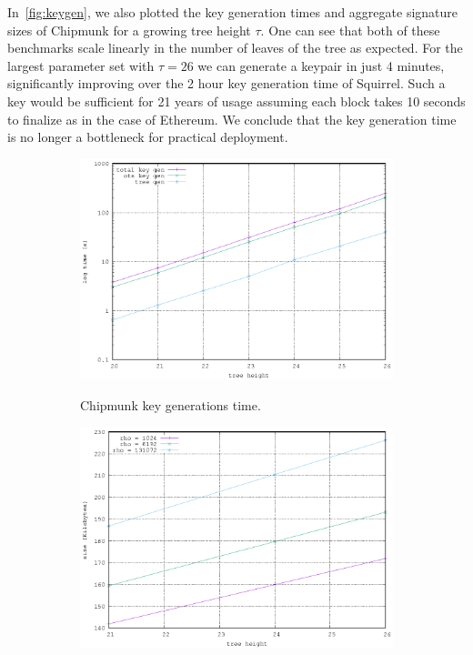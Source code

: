 In~\autoref{fig:keygen}, we also plotted the key generation times and aggregate signature sizes of Chipmunk for a growing tree height $\tau$.
One can see that both of these benchmarks scale linearly in the number of leaves of the tree as expected.
For the largest parameter set with $\tau = 26$ we can generate a keypair in just 4 minutes, significantly improving over the 2 hour key generation time of Squirrel.
Such a key would be sufficient for 21 years of usage assuming each block takes 10 seconds to finalize as in the case of Ethereum. 
We conclude that the key generation time is no longer a bottleneck for practical deployment.
\begin{figure}[H] 
  \centering
  \begin{subfigure}[b]
  {0.49\textwidth}    \centering
  \includegraphics[trim={1mm 0 4mm 0},clip,width=\textwidth]{figures/key_gen.eps}\\
  \caption{Chipmunk key generations time.}
  \end{subfigure}
\begin{subfigure}[b]{0.49\textwidth}    \centering
  \includegraphics[trim={1mm 0 4mm 0},clip,width=\textwidth]{figures/sig_size.eps}\\

\end{subfigure}
\end{figure}
